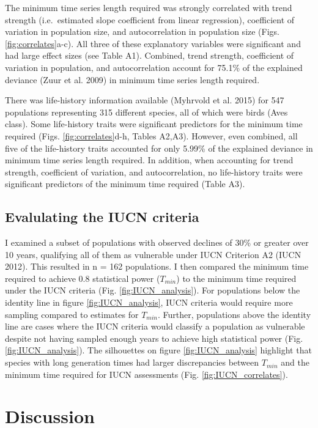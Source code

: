 \documentclass[12pt,]{article}
\begin{document}
The minimum time series length required was strongly correlated with
trend strength (i.e.~estimated slope coefficient from linear
regression), coefficient of variation in population size, and
autocorrelation in population size (Figs. \ref{fig:correlates}a-c). All
three of these explanatory variables were significant and had large
effect sizes (see Table A1). Combined, trend strength, coefficient of
variation in population, and autocorrelation account for 75.1\% of the
explained deviance (Zuur et al. 2009) in minimum time series length
required.

There was life-history information available (Myhrvold et al. 2015) for
547 populations representing 315 different species, all of which were
birds (Aves class). Some life-history traits were significant predictors
for the minimum time required (Figs. \ref{fig:correlates}d-h, Tables
A2,A3). However, even combined, all five of the life-history traits
accounted for only 5.99\% of the explained deviance in minimum time
series length required. In addition, when accounting for trend strength,
coefficient of variation, and autocorrelation, no life-history traits
were significant predictors of the minimum time required (Table A3).

\subsection{Evalulating the IUCN
criteria}\label{evalulating-the-iucn-criteria}

I examined a subset of populations with observed declines of 30\% or
greater over 10 years, qualifying all of them as vulnerable under IUCN
Criterion A2 (IUCN 2012). This resulted in n = 162 populations. I then
compared the minimum time required to achieve 0.8 statistical power
(\(T_{min}\)) to the minimum time required under the IUCN criteria (Fig.
\ref{fig:IUCN_analysis}). For populations below the identity line in
figure \ref{fig:IUCN_analysis}, IUCN criteria would require more
sampling compared to estimates for \(T_{min}\). Further, populations
above the identity line are cases where the IUCN criteria would classify
a population as vulnerable despite not having sampled enough years to
achieve high statistical power (Fig. \ref{fig:IUCN_analysis}). The
silhouettes on figure \ref{fig:IUCN_analysis} highlight that species
with long generation times had larger discrepancies between \(T_{min}\)
and the minimum time required for IUCN assessments (Fig.
\ref{fig:IUCN_correlates}).

\section{Discussion}\label{discussion}
\end{document}
